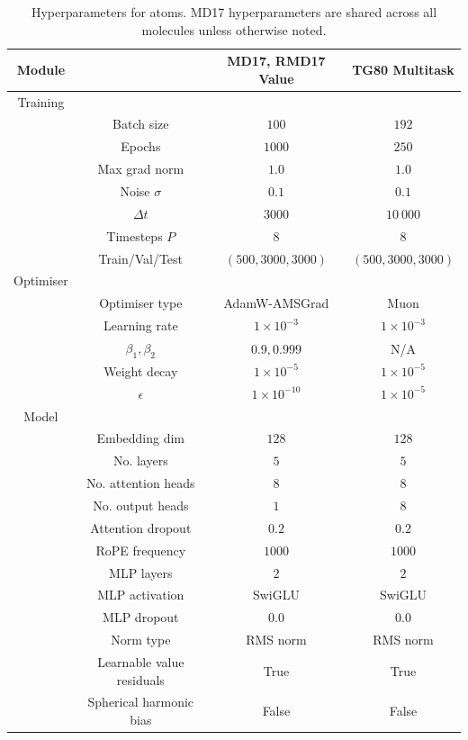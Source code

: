 \begin{table}[h]
    \centering
    \caption{Hyperparameters for \gls{atoms}. MD17 hyperparameters are shared across all molecules unless otherwise noted.}
    \label{tab:gtno_hparams}
    \begin{tabular}{cccc}
        Module & & MD17, RMD17 Value & TG80 Multitask \\
        \midrule
        Training & & \\
        & Batch size & \( 100 \) & \( 192 \) \\
        & Epochs & \( 1000 \) & \(250\) \\
        & Max grad norm & \( 1.0 \) & \(1.0\) \\
        & Noise \(\sigma\) & \( 0.1 \) & \(0.1\) \\
        & \(\Delta t\) & \( 3000 \) & \( 10\ 000 \) \\
        & Timesteps \(P\) & \( 8 \) & \( 8 \) \\
        & Train/Val/Test & \( (500,3000,3000) \) & \( (500,3000,3000) \) \\
        \midrule
        Optimiser & & \\
        & Optimiser type & AdamW-AMSGrad\cite{loshchilov_decoupled_2017} & Muon \cite{jordan_muon_2024, kim_pytorch_optimizer_2021}  \\
        & Learning rate & \( 1\times10^{-3} \) & \( 1\times10^{-3} \) \\
        & \(\beta_1, \beta_2\) & \( 0.9, 0.999 \) & N/A \\
        & Weight decay & \( 1\times10^{-5} \) & \( 1\times10^{-5} \) \\
        & \(\epsilon\) & \( 1\times10^{-10} \) & \( 1\times10^{-5} \) \\
        \midrule
        Model & & \\
        & Embedding dim & \( 128 \) & \( 128 \) \\
        & No. layers & \( 5 \) & \( 5 \) \\
        & No. attention heads & \( 8 \) & \( 8 \) \\
        & No. output heads & \(1\) & \(8\) \\
        & Attention dropout & \( 0.2 \) & \( 0.2 \) \\
        & RoPE frequency & \( 1000 \) & \( 1000 \)\\
        & MLP layers & \( 2 \) & \( 2 \) \\
        & MLP activation & SwiGLU & SwiGLU \\
        & MLP dropout & \( 0.0 \) & \( 0.0 \) \\
        & Norm type & RMS norm & RMS norm \\
        & Learnable value residuals & True & True \\
        & Spherical harmonic bias & False & False \\
        \bottomrule
    \end{tabular}
\end{table}


